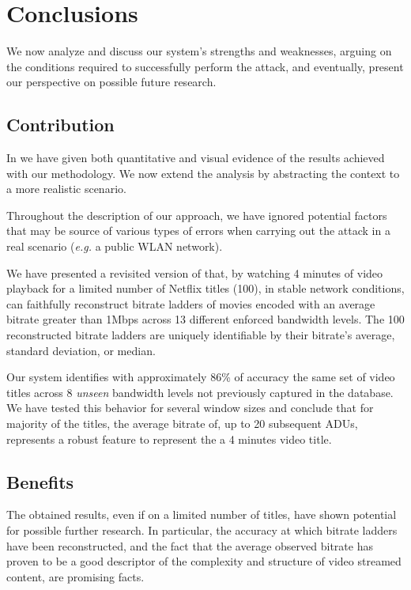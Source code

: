 \chapter{Conclusions}\label{sec:conclusion}

We now analyze and discuss our system's strengths and weaknesses, arguing on
the conditions required to successfully perform the attack, and eventually,
present our perspective on possible future research.

\section{Contribution}

In  we have given both quantitative and visual evidence of the
results achieved with our methodology. We now extend the analysis by abstracting
the context to a more realistic scenario. 

Throughout the description of our approach, we have ignored potential factors
that may be source of various types of errors when carrying out the attack in a
real scenario (\emph{e.g.} a public WLAN network). 

We have presented a revisited version of \cite{netflix-real-time} that, by
watching 4 minutes of video playback for a limited number of Netflix titles
(100), in stable network conditions, can faithfully reconstruct bitrate ladders
of movies encoded with an average bitrate greater than 1Mbps across 13
different enforced bandwidth levels. The 100 reconstructed bitrate ladders are
uniquely identifiable by their bitrate's average, standard deviation, or
median.

Our system identifies with approximately 86\% of accuracy the same set of video
titles across 8 \emph{unseen} bandwidth levels not previously captured in the
database. We have tested this behavior for several window sizes and conclude
that for majority of the titles, the average bitrate of, up to 20 subsequent
ADUs, represents a robust feature to represent the a 4 minutes video title.

\newpage
\section{Benefits}

The obtained results, even if on a limited number of titles, have shown
potential for possible further research. In particular, the accuracy at which
bitrate ladders have been reconstructed, and the fact that the average observed
bitrate has proven to be a good descriptor of the complexity and structure of
video streamed content, are promising facts.

